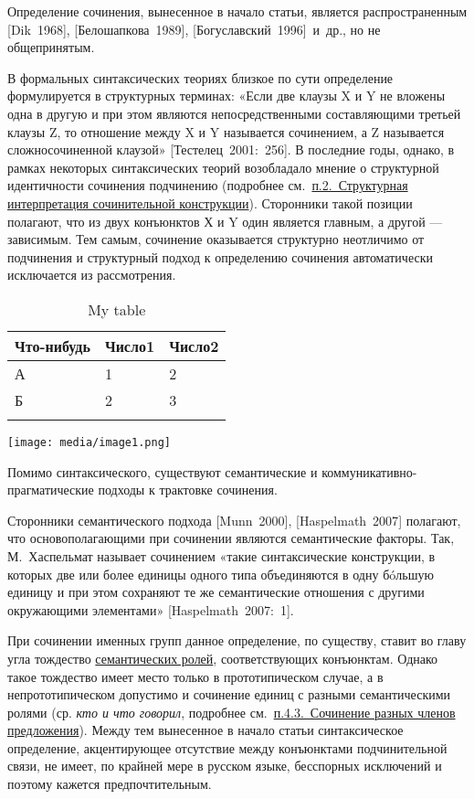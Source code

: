 Определение сочинения, вынесенное в начало статьи, является
распространенным {[}Dik~1968{]}, {[}Белошапкова~1989{]},
{[}Богуславский~1996{]}~и~др., но не общепринятым.

В формальных синтаксических теориях близкое по сути определение
формулируется в структурных терминах: «Если две клаузы X и Y не вложены
одна в другую и при этом являются непосредственными составляющими
третьей клаузы Z, то отношение между X и Y называется сочинением, а Z
называется сложносочиненной клаузой» {[}Тестелец~2001:~256{]}. В
последние годы, однако, в рамках некоторых синтаксических теорий
возобладало мнение о структурной идентичности сочинения подчинению
(подробнее см.~\underline{п.2.~Структурная интерпретация сочинительной
  конструкции}). Сторонники такой позиции полагают, что из двух конъюнктов
Х и Y один является главным, а другой --- зависимым. Тем самым, сочинение
оказывается структурно неотличимо от подчинения и структурный подход к
определению сочинения автоматически исключается из рассмотрения.

\begin{longtable}[]{@{}lll@{}}
  \toprule
  Что-нибудь & Число1 & Число2 \\
  \midrule
  \endhead
  А          & 1      & 2      \\
  Б          & 2      & 3      \\
  \bottomrule
  \caption{My table}\label{tab:label}
\end{longtable}

\texttt{[image: media/image1.png]}

Помимо синтаксического, существуют семантические и
коммуникативно-прагматические подходы к трактовке сочинения.

Сторонники семантического подхода {[}Munn~2000{]}, {[}Haspelmath~2007{]}
полагают, что основополагающими при сочинении являются семантические
факторы. Так, М.~Хаспельмат называет сочинением «такие синтаксические
конструкции, в которых две или более единицы одного типа объединяются в
одну бóльшую единицу и при этом сохраняют те же семантические отношения
с другими окружающими элементами» {[}Haspelmath~2007:~1{]}.

При сочинении именных групп данное определение, по существу, ставит во
главу угла тождество \underline{семантических ролей}, соответствующих
конъюнктам. Однако такое тождество имеет место только в прототипическом
случае, а в непрототипическом допустимо и сочинение единиц с разными
семантическими ролями (ср. \textit{кто и что говорил}, подробнее
см.~\underline{п.4.3.~Сочинение разных членов предложения}). Между тем
вынесенное в начало статьи синтаксическое определение, акцентирующее
отсутствие между конъюнктами подчинительной связи, не имеет, по крайней
мере в русском языке, бесспорных исключений и поэтому кажется
предпочтительным.

